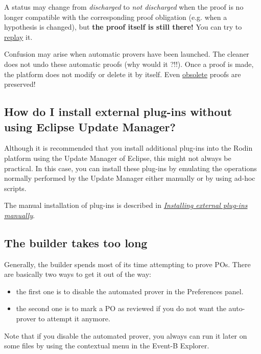 A status may change from \emph{discharged} to \emph{not discharged} when the proof is no longer compatible with the corresponding proof obligation (e.g. when a hypothesis is changed), but \textbf{the proof itself is still there!}
You can try to \href{http://wiki.event-b.org/index.php/Proof_Obligation_Commands#Proof_Replay_on_Undischarged_POs}{replay} it.

Confusion may arise when automatic provers have been launched. The cleaner does not undo these automatic proofs (why would it ?!!). Once a proof is made, the platform does not modify or delete it by itself. Even \href{http://wiki.event-b.org/index.php/Proof_Purger_Interface#Why_proofs_become_obsolete}{obsolete} proofs are preserved!

\subsection{How do I install external plug-ins without using Eclipse Update Manager?}

Although it is recommended that you install additional plug-ins into the Rodin platform using the Update Manager of Eclipse, this might not always be practical. In this case, you can install these plug-ins by emulating the operations normally performed by the Update Manager either manually or by using ad-hoc scripts. 

The manual installation of plug-ins is described in \href{http://wiki.event-b.org/index.php/Installing_external_plug-ins_manually}{\emph{Installing external plug-ins manually}}. 

\subsection{The builder takes too long}

Generally, the builder spends most of its time attempting to prove POs. There are basically two ways to get it out of the way: 

\begin{itemize}
	\item the first one is to disable the automated prover in the \textsf{Preferences} panel. 
	\item the second one is to mark a PO as reviewed if you do not want the auto-prover to attempt it anymore. 
\end{itemize}

Note that if you disable the automated prover, you always can run it later on some files by using the contextual menu in the Event-B Explorer. 

